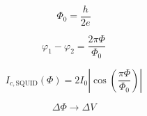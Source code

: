 
\[
\Phi_0 = \frac{h}{2e}
\]

\[
\varphi_1-\varphi_2 = \frac{2\pi\Phi}{\Phi_0}
\]

\[
I_{c,\mathrm{SQUID}}(\Phi)=2I_0\left|\cos\left(\frac{\pi\Phi}{\Phi_0}\right)\right|
\]

\[
\Delta \Phi \rightarrow \Delta V
\]
